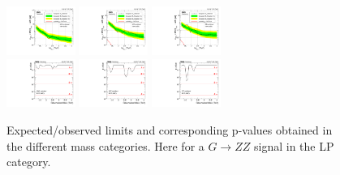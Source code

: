 \begin{figure}[h!]
\centering
\includegraphics[width=0.20\textwidth]{figures/analysis/search1/AN-15-211/limits/brazilianFlag_BulkZZ_WWLP_13TeV_wPDF.pdf}
\includegraphics[width=0.20\textwidth]{figures/analysis/search1/AN-15-211/limits/brazilianFlag_BulkZZ_WZLP_13TeV_wPDF.pdf}
\includegraphics[width=0.20\textwidth]{figures/analysis/search1/AN-15-211/limits/brazilianFlag_BulkZZ_ZZLP_13TeV_wPDF.pdf}\\
\includegraphics[width=0.20\textwidth]{figures/analysis/search1/AN-15-211/pvalues/pvalue_BulkZZinWW_low_purity.pdf}
\includegraphics[width=0.20\textwidth]{figures/analysis/search1/AN-15-211/pvalues/pvalue_BulkZZinWZ_low_purity.pdf}
\includegraphics[width=0.20\textwidth]{figures/analysis/search1/AN-15-211/pvalues/pvalue_BulkZZinZZ_low_purity.pdf}
\caption{Expected/observed limits and corresponding p-values obtained in the different mass categories. Here for a $G\rightarrow ZZ$ signal in the LP category.}
\label{fig:app:Limits_LPBulkZZ}
\end{figure}

